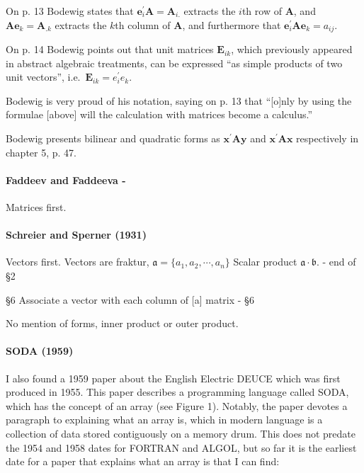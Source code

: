 On p. 13 Bodewig states that $\mathbf e^\prime_i \mathbf A = \mathbf A_{i.}$
extracts the $i$th row of $\mathbf A$, and $\mathbf A \mathbf e_k = \mathbf A_{.k}$
extracts the $k$th column of $\mathbf A$, and furthermore that
$\mathbf e^\prime_i \mathbf A \mathbf e_k = a_{ij}$.

On p. 14 Bodewig points out that unit matrices $\mathbf E_{ik}$, which previously
appeared in abstract algebraic treatments, can be expressed ``as simple products
of two unit vectors'', i.e.\ $\mathbf E_{ik} = e^\prime_i e_k$.

Bodewig is very proud of his notation, saying on p. 13 that
``[o]nly by using the formulae [above] will the calculation with matrices become a calculus.''

Bodewig presents bilinear and quadratic forms as $\mathbf{x^\prime A y}$ and
$\mathbf{x^\prime A x}$ respectively in chapter 5, p. 47.



\paragraph{Faddeev and Faddeeva - \cite{Faddeev1959}}

Matrices first.



\paragraph{Schreier and Sperner (1931)~\cite{Schreier1931}}

Vectors first.
Vectors are fraktur, $\mathfrak a = \{a_1, a_2, \cdots, a_n\}$
Scalar product $\mathfrak a \cdot \mathfrak b$. - end of \S 2

\S6 Associate a vector with each column of [a] matrix - \S 6

No mention of forms, inner product or outer product.


\paragraph{SODA (1959)}

I also found a 1959 paper about the English Electric DEUCE which
was first produced in 1955. This paper describes a programming
language called SODA, which has the concept of an array (see Figure
1). Notably, the paper devotes a paragraph to explaining what an array
is, which in modern language is a collection of data stored
contiguously on a memory drum. This does not predate the 1954 and 1958
dates for FORTRAN and ALGOL, but so far it is the earliest date for a
paper that explains what an array is that I can find:

